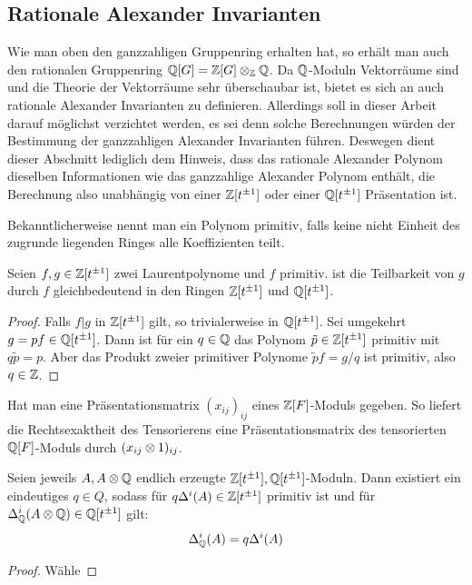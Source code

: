 	 \subsection{Rationale Alexander Invarianten}
	 \label{ssec:rationalalex}
	 Wie man oben den ganzzahligen Gruppenring erhalten hat, so erhält man auch den rationalen Gruppenring $\mathbb{Q}[G]=\mathbb{Z}[G] \otimes_{\mathbb{Z}} \mathbb{Q}$. Da $\mathbb{Q}$-Moduln Vektorräume sind und die Theorie der Vektorräume sehr überschaubar ist, bietet es sich an auch rationale Alexander Invarianten zu definieren. Allerdings soll in dieser Arbeit darauf möglichst verzichtet werden, es sei denn solche Berechnungen würden der Bestimmung der ganzzahligen Alexander Invarianten führen. Deswegen dient dieser Abschnitt lediglich dem Hinweis, dass das rationale Alexander Polynom dieselben Informationen wie das ganzzahlige Alexander Polynom enthält, die Berechnung also unabhängig von einer $\mathbb{Z}[t^{\pm 1}]$ oder einer $\mathbb{Q}[t^{\pm 1}]$ Präsentation ist.

	 Bekanntlicherweise nennt man ein Polynom primitiv, falls keine nicht Einheit des zugrunde liegenden Ringes alle Koeffizienten teilt. 
	 \begin{lem}
	 	Seien $f,g \in \mathbb{Z}[t^{\pm 1}]$ zwei Laurentpolynome und $f$ primitiv. ist die Teilbarkeit von $g$ durch $f$ gleichbedeutend in den Ringen $\mathbb{Z}[t^{\pm 1}]$ und $\mathbb{Q}[t^{\pm 1}]$.
	 \end{lem}
	 \begin{proof}
	 	Falls $f|g$ in $\mathbb{Z}[t^{\pm 1}] $ gilt, so trivialerweise in $\mathbb{Q}[t^{\pm 1}]$. Sei umgekehrt $g=pf \in \mathbb{Q}[t^{\pm 1}]$. Dann ist für ein $q \in \mathbb{Q}$ das Polynom $\tilde p \in \mathbb{Z}[t^{\pm 1}]$ primitiv mit $q\tilde p = p$. Aber das Produkt zweier primitiver Polynome $\tilde p f = g/q$ ist primitiv, also $q \in \mathbb{Z}$.
	 \end{proof}

	 \begin{bem}
	 	Hat man eine Präsentationsmatrix $(x_{ij})_{ij}$ eines $\mathbb{Z}[F]$-Moduls gegeben. So liefert die Rechtsexaktheit des Tensorierens eine Präsentationsmatrix des tensorierten $\mathbb{Q}[F]$-Moduls durch $(x_{ij} \otimes 1)_{ij}$.
	 \end{bem}

	 \begin{prop}
	 	\label{prop:tensoring}
	 	Seien jeweils $A,A\otimes \mathbb{Q}$ endlich erzeugte $\mathbb{Z}[t^{\pm 1}], \mathbb{Q}[t^{\pm 1}]$-Moduln. Dann existiert ein eindeutiges $q\in Q$, sodass für $q\Delta^i(A) \in \mathbb{Z}[t^{\pm 1}]$ primitiv ist und für $\Delta^i_{\mathbb{Q}}(A\otimes \mathbb{Q}) \in \mathbb{Q}[t^{\pm 1}]$ gilt:
	 	\[
	 		 \Delta^i_{\mathbb{Q}}(A) = q\Delta^i(A) 
	 	\]
	 \end{prop}
	     \begin{proof}
	     	Wähle 
	     \end{proof}